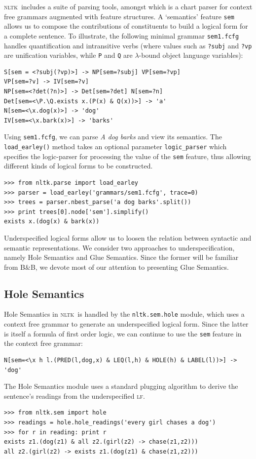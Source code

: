 \documentclass[11pt, a4paper]{article}
\newcommand{\BB}{\textsc{B{\small\&}B}}
\newcommand{\LF}{\textsc{lf}}
\newcommand{\NLTK}{\textsc{nltk}}
\begin{document}
\NLTK\ includes a suite of parsing tools, amongst which is a chart
parser for context free grammars augmented with feature structures. A
`semantics' feature \texttt{sem} allows us to compose the
contributions of constituents to build a logical form for a complete
sentence.  To illustrate, the following minimal grammar
\texttt{sem1.fcfg} handles quantification and intransitive verbs
(where values such as \texttt{?subj} and \texttt{?vp} are unification
variables, while \texttt{P} and \texttt{Q} are $\lambda$-bound object
language variables):
\begin{Verbatim}
S[sem = <?subj(?vp)>] -> NP[sem=?subj] VP[sem=?vp]
VP[sem=?v] -> IV[sem=?v]
NP[sem=<?det(?n)>] -> Det[sem=?det] N[sem=?n]
Det[sem=<\P.\Q.exists x.(P(x) & Q(x))>] -> 'a'
N[sem=<\x.dog(x)>] -> 'dog'
IV[sem=<\x.bark(x)>] -> 'barks'
\end{Verbatim}
Using \texttt{sem1.fcfg}, we can parse \textit{A dog barks} and view
its semantics. 
The \texttt{load\_earley()} method
takes an optional parameter \texttt{logic\_parser} which specifies the
logic-parser for processing the value of the \texttt{sem} feature, thus
allowing different kinds of logical forms to be constructed.
\begin{Verbatim}
>>> from nltk.parse import load_earley
>>> parser = load_earley('grammars/sem1.fcfg', trace=0)
>>> trees = parser.nbest_parse('a dog barks'.split())
>>> print trees[0].node['sem'].simplify()
exists x.(dog(x) & bark(x))
\end{Verbatim}

Underspecified logical forms allow us to loosen the relation between
syntactic and semantic representations. We consider two approaches to
underspecification, namely Hole
Semantics and Glue Semantics. Since the former will be familiar from 
\BB, we devote most of our attention to presenting Glue
Semantics.

\subsection{Hole Semantics}

Hole Semantics in \NLTK\ is handled by the
\texttt{nltk.sem.hole} module, which uses a context free grammar to
generate an underspecified logical form.  Since the latter is itself a
formula of first order logic, we can continue to use the \texttt{sem} feature
in the context free grammar:
\begin{Verbatim}[frame=none,fontsize=\small]
N[sem=<\x h l.(PRED(l,dog,x) & LEQ(l,h) & HOLE(h) & LABEL(l))>] -> 'dog'
\end{Verbatim}
The Hole Semantics module uses a standard plugging algorithm to derive the
sentence's readings from the underspecified \LF.
\begin{Verbatim}
>>> from nltk.sem import hole
>>> readings = hole.hole_readings('every girl chases a dog')
>>> for r in reading: print r
exists z1.(dog(z1) & all z2.(girl(z2) -> chase(z1,z2)))
all z2.(girl(z2) -> exists z1.(dog(z1) & chase(z1,z2)))
\end{Verbatim}
\end{document}
